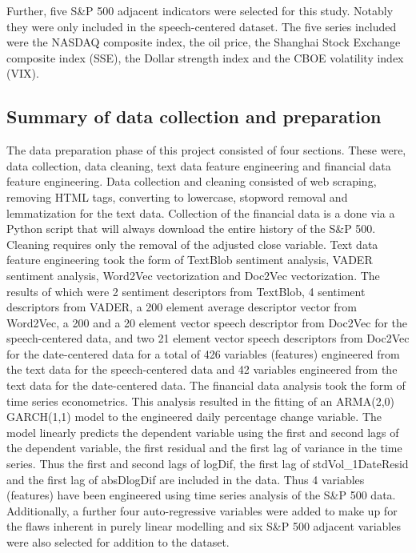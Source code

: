 \documentclass[11pt,preprint, authoryear]{elsarticle}
\numberwithin{equation}{section}
\numberwithin{figure}{section}
\numberwithin{table}{section}
\begin{document}
Further, five S\&P 500 adjacent indicators were selected for this study.
Notably they were only included in the speech-centered dataset. The five
series included were the NASDAQ composite index, the oil price, the
Shanghai Stock Exchange composite index (SSE), the Dollar strength index
and the CBOE volatility index (VIX).

\hypertarget{summary-of-data-collection-and-preparation}{%
\subsection{Summary of data collection and
preparation}\label{summary-of-data-collection-and-preparation}}

The data preparation phase of this project consisted of four sections.
These were, data collection, data cleaning, text data feature
engineering and financial data feature engineering. Data collection and
cleaning consisted of web scraping, removing HTML tags, converting to
lowercase, stopword removal and lemmatization for the text data.
Collection of the financial data is a done via a Python script that will
always download the entire history of the S\&P 500. Cleaning requires
only the removal of the adjusted close variable. Text data feature
engineering took the form of TextBlob sentiment analysis, VADER
sentiment analysis, Word2Vec vectorization and Doc2Vec vectorization.
The results of which were 2 sentiment descriptors from TextBlob, 4
sentiment descriptors from VADER, a 200 element average descriptor
vector from Word2Vec, a 200 and a 20 element vector speech descriptor
from Doc2Vec for the speech-centered data, and two 21 element vector
speech descriptors from Doc2Vec for the date-centered data for a total
of 426 variables (features) engineered from the text data for the
speech-centered data and 42 variables engineered from the text data for
the date-centered data. The financial data analysis took the form of
time series econometrics. This analysis resulted in the fitting of an
ARMA(2,0) GARCH(1,1) model to the engineered daily percentage change
variable. The model linearly predicts the dependent variable using the
first and second lags of the dependent variable, the first residual and
the first lag of variance in the time series. Thus the first and second
lags of logDif, the first lag of stdVol\_1DateResid and the first lag of
absDlogDif are included in the data. Thus 4 variables (features) have
been engineered using time series analysis of the S\&P 500 data.
Additionally, a further four auto-regressive variables were added to
make up for the flaws inherent in purely linear modelling and six S\&P
500 adjacent variables were also selected for addition to the dataset.
\end{document}

